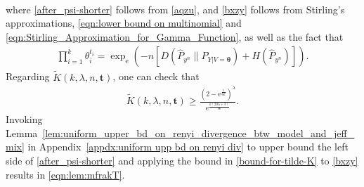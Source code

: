 \documentclass[journal, 10pt]{IEEEtran}
\newcommand{\rme}{\mathrm{e}}
\theoremstyle{plain}
\theoremstyle{plain}
\theoremstyle{plain}
\theoremstyle{plain}
\newcommand{\boldtheta}{\mathbold{\theta}}
\newcommand{\boldt}{\mathbold{t}}
\begin{document}
\begin{appendices}
\begin{IEEEproof}
\begin{align}
\end{align}
where \eqref{after_psi-shorter} follows from \eqref{aqzu}, and \eqref{bxzy} follows from Stirling's approximations, \eqref{eqn:lower bound on multinomial} and \eqref{eqn:Stirling_Approximation_for_Gamma_Function}, as well as the fact that
\begin{align}
\prod_{i=1}^{k} \theta_i^{t_i} =\exp_\rme \left(-n\left[D(\widehat{P}_{y^n}\|P_{Y|V=\boldtheta})+H(\widehat{P}_{y^n})\right]\right) \text{.}
\end{align}
Regarding $\widetilde{K}(k, \lambda, n, \boldt )$, one can check that
\begin{align}
\widetilde{K}(k, \lambda, n, \boldt )\ge \frac{(2-\rme^\frac{1}{6k})^\lambda}{\rme^{\frac{k(20\lambda+3)}{36}}} \text{.} \label{bound-for-tilde-K}
\end{align}
Invoking Lemma~\ref{lem:uniform_upper_bd_on_renyi_divergence_btw_model_and_jeff_mix} in Appendix~\ref{appdx:uniform upp bd on renyi div} to upper bound the left side of \eqref{after_psi-shorter} and applying the bound in \eqref{bound-for-tilde-K} to \eqref{bxzy} results in \eqref{eqn:lem:mfrakT}.
\end{IEEEproof}

\end{appendices}
\end{document}
